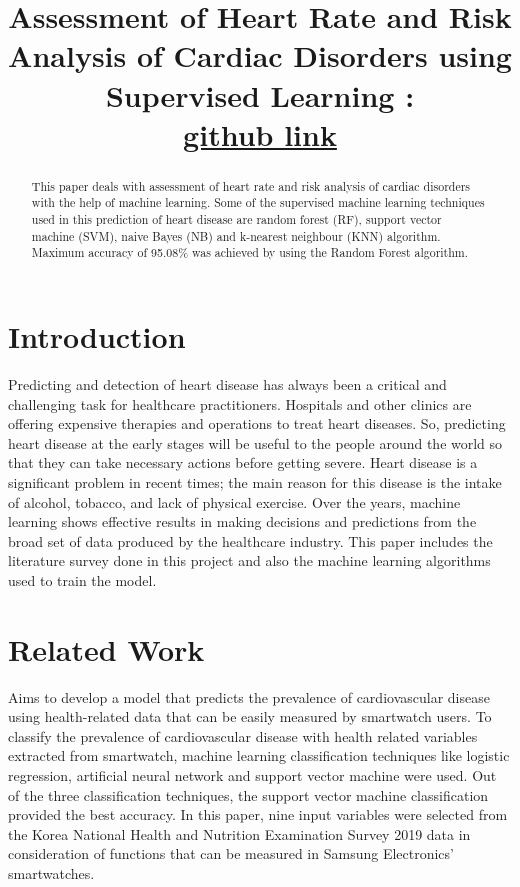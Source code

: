 \documentclass{article}
\title{Assessment of Heart Rate and Risk Analysis of Cardiac Disorders using Supervised Learning :\\ \href{https://github.com/Sanatan-Shrivastava/CST403-PR}{github link}}
\begin{document}
\maketitle

\begin{abstract}
  This paper deals with assessment of heart rate and risk analysis of cardiac disorders with the help of machine learning. Some of the supervised machine learning techniques used in this prediction of heart disease are random forest (RF), support vector machine (SVM), naive Bayes (NB) and k-nearest neighbour (KNN) algorithm. Maximum accuracy of 95.08\% was achieved by using the Random Forest algorithm.
\end{abstract}

\section{Introduction}
Predicting and detection of heart disease has always been a critical and challenging task for healthcare practitioners. Hospitals and other clinics are offering expensive therapies and operations to treat heart diseases. So, predicting heart disease at the early stages will be useful to the people around the world so that they can take necessary actions before getting severe. Heart disease is a significant problem in recent times; the main reason for this disease is the intake of alcohol, tobacco, and lack of physical exercise. Over the years, machine learning shows effective results in making decisions and predictions from the broad set of data produced by the healthcare industry. This paper includes the literature survey done in this project and also the machine learning algorithms used to train the model.

\section{Related Work}

 \cite{rt1} Aims to develop a model that predicts the prevalence of cardiovascular disease using health-related data that can be easily measured by smartwatch users. To classify the prevalence of cardiovascular disease with health related variables extracted from smartwatch, machine learning classification techniques like logistic regression, artificial neural network and support vector machine were used. Out of the three classification techniques, the support vector machine classification provided the best accuracy. In this paper, nine input variables were selected from the Korea National Health and Nutrition Examination Survey 2019 data in consideration of functions that can be measured in Samsung Electronics’ smartwatches.
\end{document}
